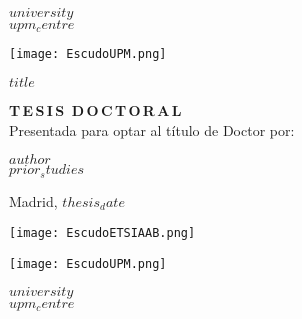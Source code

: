 \begin{center}
\begin{spacing}{1.3}
    \textbf{\large {$university$}}\\
    \textbf{\large {$upm_centre$}}\\
    \vspace{5mm}
\end{spacing}
    \texttt{[image: EscudoUPM.png]}

\begin{spacing}{2.0}
\textbf{\LARGE {$title$}}
\end{spacing}

\vspace{15 mm}

\begin{spacing}{1.3}
\textbf{\LARGE {T\,E\,S\,I\,S\, D\,O\,C\,T\,O\,R\,A\,L}}\\
\medskip
{\large {Presentada para optar al título de Doctor por:}}
\end{spacing}
\end{center}


\begin{center}
\begin{spacing}{1.3}
\textbf{\Large {$author$}}\\
{\large {$prior_studies$}}\\
\end{spacing}
\end{center}

\vspace{\fill}

\begin{center}
    \large {Madrid, $thesis_date$}
\end{center}

\newpage



\begin{minipage}{0.20\textwidth}
        \texttt{[image: EscudoETSIAAB.png]}   
\end{minipage}
\begin{minipage}{0.20\textwidth}
        \texttt{[image: EscudoUPM.png]}
\end{minipage}
\begin{minipage}{0.65\textwidth} \centering
    {$university$}\\
    {$upm_centre$}\\
\end{minipage}

